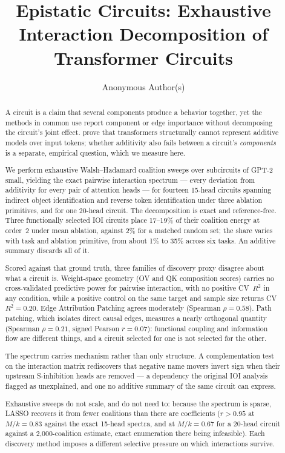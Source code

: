 \documentclass{article}
\title{Epistatic Circuits: Exhaustive Interaction Decomposition of Transformer Circuits}
\author{Anonymous Author(s)}
\begin{document}
\maketitle

\begin{abstract}
A circuit is a claim that several components produce a behavior together, yet the methods in common use report component or edge importance without decomposing the circuit's joint effect. \citet{leemann2024slalom} prove that
transformers structurally cannot represent additive models over input tokens; whether additivity
also fails between a circuit's \emph{components} is a separate, empirical question, which we measure here.

We perform exhaustive Walsh--Hadamard coalition sweeps over subcircuits of GPT-2 small, yielding the exact pairwise interaction spectrum --- every deviation from additivity for every pair of attention heads --- for fourteen 15-head circuits spanning indirect object
identification and reverse token identification under three ablation primitives, and for one
20-head circuit. The decomposition is exact and reference-free. Three functionally selected IOI circuits place 17--19\% of their coalition energy at order~2 under mean ablation, against 2\% for a matched random set; the share varies with task and ablation primitive, from about 1\% to 35\% across six tasks. An additive summary discards all of it.

Scored against that ground truth, three families of discovery proxy disagree about what a circuit
is. Weight-space geometry (OV and QK composition scores) carries no cross-validated predictive power for pairwise interaction, with no positive CV~$R^2$ in any condition, while a positive control on the same target and sample size returns CV~$R^2 = 0.20$. Edge Attribution
Patching agrees moderately (Spearman $\rho = 0.58$). Path patching, which isolates direct causal
edges, measures a nearly orthogonal quantity (Spearman $\rho = 0.21$, signed Pearson $r = 0.07$):
functional coupling and information flow are different things, and a circuit selected for one is
not selected for the other.

The spectrum carries mechanism rather than only structure. A complementation test on the
interaction matrix rediscovers that negative name movers invert sign when their upstream
S-inhibition heads are removed --- a dependency the original IOI analysis flagged as unexplained,
and one no additive summary of the same circuit can express.

Exhaustive sweeps do not scale, and do not need to: because the spectrum is sparse, LASSO recovers it
from fewer coalitions than there are coefficients ($r > 0.95$ at $M/k = 0.83$ against the exact 15-head spectra, and at $M/k = 0.67$ for a 20-head circuit against a 2{,}000-coalition estimate, exact enumeration there being infeasible). Each discovery method imposes a different selective pressure on which interactions survive.
\end{abstract}
\end{document}
